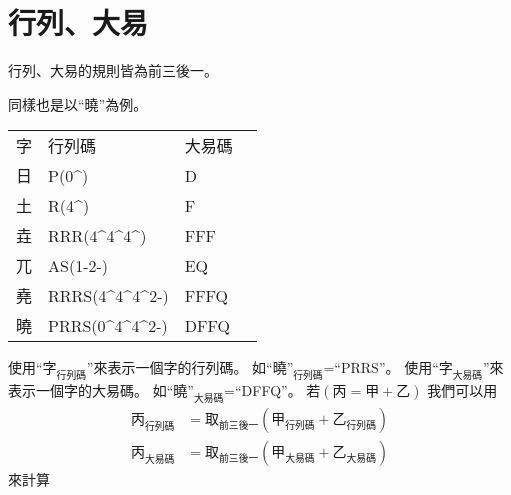 \documentclass{article}
\def\tac{\textasciicircum}
\begin{document}
\section{行列、大易}
行列、大易的規則皆為前三後一。

同樣也是以``曉''為例。
\begin{tabular}{llll}
字  & 行列碼 & 大易碼\\
日  & P(0\tac) & D\\
土  & R(4\tac) & F\\
垚  & RRR(4\tac4\tac4\tac) & FFF\\
兀  & AS(1-2-) & EQ\\
堯  & RRRS(4\tac4\tac4\tac2-) & FFFQ\\
曉  & PRRS(0\tac4\tac4\tac2-) & DFFQ\\
\end{tabular}

使用``$\mbox{字}_{\mbox{行列碼}}$''來表示一個字的行列碼。
如$\mbox{``曉''}_{\mbox{行列碼}}$=``PRRS''。
使用``$\mbox{字}_{\mbox{大易碼}}$''來表示一個字的大易碼。
如$\mbox{``曉''}_{\mbox{大易碼}}$=``DFFQ''。
若$(\mbox{丙}=\mbox{甲}+\mbox{乙})$
我們可以用
\begin{subequations}
  \begin{align}
  \mbox{丙}_{\mbox{行列碼}}&=\mbox{取}_{\mbox{前三後一}}(\mbox{甲}_{\mbox{行列碼}}+\mbox{乙}_{\mbox{行列碼}})\\
  \mbox{丙}_{\mbox{大易碼}}&=\mbox{取}_{\mbox{前三後一}}(\mbox{甲}_{\mbox{大易碼}}+\mbox{乙}_{\mbox{大易碼}})
  \end{align}
\end{subequations}
來計算
\end{document}
